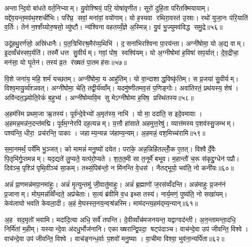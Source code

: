 अन्तान्दि॒वो बा॑धते वर्त॒निभ्याम्। यु॒वोश्श्रियं॒ परि॒ योषा॑वृणीत। सूरो॑ दुहि॒ता परि॑तक्मियायाम्। यद्दे॑व॒यन्त॒मव॑थ॒श्शची॑भिः। परि॑घ्र॒ सवां॒ मना॑वां॒ वयो॑गाम्। यो ह॒स्यवा रथिरा॒वस्त॑ उ॒स्राः। रथो॑ युजा॒नः प॑रि॒याति॑ व॒र्तिः। तेन॑ न॒श्शँय्योरु॒षसो॒ व्यु॑ष्टौ। न्य॑श्विना वहतय्यँ॒ज्ञे अ॒स्मिन्न्। यु॒वं भु॒ज्युमव॑विद्ध समु॒द्रे॥५६॥

उदू॑हथु॒रर्ण॑सो॒ अस्रि॑धानैः। प॒त॒त्रिभि॑रश्र॒मैर॑व्य॒थिभि॑। द॒सना॑भिरश्विना पा॒रय॑न्ता। अग्नी॑षोमा॒ यो अ॒द्य वाम्। इ॒दव्वँच॑स्सप॒र्यति॑। तस्मै॑ धत्त सु॒वीर्यम्। गवां॒ पोष॒ स्वश्वि॑यम्। यो अ॒ग्नीषोमा॑ ह॒विषा॑ सप॒र्यात्। दे॒व॒द्रीचा॒ मन॑सा॒ यो घृ॒तेन॑। तस्य॑ व्र॒त र॑ख्षतं पा॒तमह॑सः॥५७॥

वि॒शे जना॑य॒ महि॒ शर्म॑ यच्छतम्। अग्नी॑षोमा॒ य आहु॑तिम्। यो वा॒न्दाशाद्ध॒विष्कृ॑तिम्। स प्र॒जया॑ सु॒वीर्यम्। विश्व॒मायु॒र्व्य॑श्ञवत्। अग्नी॑षोमा॒ चेति॒ तद्वी॒र्य॑व्वाँम्। यदमु॑ष्णीतमव॒सं प॒णिङ्गोः। अवा॑तिरतं॒ प्रथ॑यस्य॒ शेष॑। अवि॑न्दत॒ञ्ज्योति॒रेकं॑ ब॒हुभ्य॑। अग्नी॑षोमावि॒म सु मेऽग्नी॑षोमा ह॒विष॒ प्रस्थि॑तस्य॥५८॥\anuvakamend[ज॒भा॒र॒ द्यौर॒ग्नेरु॒पस्थ॑ उप॒क्ष्यन्तो॑ बद्बधा॒नो व॒ध्वा॑ याद॑मानस्समु॒द्रेऽह॑स॒ प्रस्थि॑तस्य]

अ॒हम॑स्मि प्रथम॒जा ऋ॒तस्य॑। पूर्व॑न्दे॒वेभ्यो॑ अ॒मृत॑स्य॒ नाभि॑। यो मा॒ ददा॑ति॒ स इदे॒वमावाः। अ॒हमन्न॒मन्न॑न॒दन्त॑मद्मि। पूर्व॑म॒ग्नेरपि॑ दह॒त्यन्नम्। य॒त्तौ हा॑साते अहमुत्त॒रेषु॑। व्यात्त॑मस्य प॒शव॑स्सु॒जम्भम्। पश्य॑न्ति॒ धीरा॒ प्रच॑रन्ति॒ पाकाः। जहाम्य॒न्यन्न ज॑हाम्य॒न्यम्। अ॒हमन्नं॒ वश॒मिच्च॑रामि॥५९॥

स॒मा॒नमर्थं॒ पर्ये॑मि भु॒ञ्जत्। को मामन्नं॑ मनु॒ष्यो॑ दयेत। परा॑के॒ अन्न॒न्निहि॑तल्लोँ॒क ए॒तत्। विश्वैर्दे॒वैः पि॒तृभि॑र्गु॒प्तमन्नम्। यद॒द्यते॑ लु॒प्यते॒ यत्प॑रो॒प्यते। श॒त॒त॒मी सा त॒नूर्मे॑ बभूव। म॒हान्तौ॑ च॒रू स॑कृद्दु॒ग्धेन॑ पप्रौ। दिव॑ञ्च॒ पृश्ञि॑ पृथि॒वीञ्च॑ सा॒कम्। तथ्सं॒पिब॑न्तो॒ न मि॑नन्ति वे॒धस॑। नैतद्भूयो॒ भव॑ति॒ नो कनी॑यः॥६०॥

अन्नं॑ प्रा॒णमन्न॑मपा॒नमा॑हुः। अन्नं॑ मृ॒त्युन्तमु॑ जी॒वातु॑माहुः। अन्नं॑ ब्र॒ह्माणो॑ ज॒रस॑व्वँदन्ति। अन्न॑माहुः प्र॒जन॑नं प्र॒जानाम्। मोघ॒मन्न॑व्विँन्दते॒ अप्र॑चेताः। स॒त्यं ब्र॑वीमि व॒ध इथ्स तस्य॑। नार्य॒मणं॒ पुष्य॑ति॒ नो सखा॑यम्। केव॑लाघो भवति केवला॒दी। अ॒हं मे॒घस्स्त॒नय॒न्वऱ़्ष॑न्नस्मि। माम॑दन्त्य॒हम॑द्म्य॒न्यान्॥६१॥

अ॒ह सद॒मृतो॑ भवामि। मदा॑दि॒त्या अधि॒ सर्वे॑ तपन्ति। दे॒वीव्वाँच॑मजनयन्त॒ यद्वाग्वद॑न्ती। अ॒न॒न्तामन्ता॒दधि॒ निर्मि॑तां म॒हीम्। यस्यान्दे॒वा अ॑दधु॒र्भोज॑नानि। एकाख्षरान्द्वि॒पदा॒ षट्प॑दाञ्च। वाच॑न्दे॒वा उप॑ जीवन्ति॒ विश्वे। वाच॑न्दे॒वा उप॑ जीवन्ति॒ विश्वे। वाच॑ङ्गन्ध॒र्वाः प॒शवो॑ मनु॒ष्याः। वा॒चीमा विश्वा॒ भुव॑ना॒न्यर्पि॑ता॥६२॥

